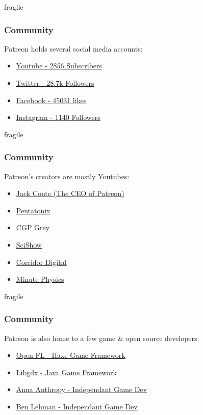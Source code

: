 \documentclass[10pt, compress]{beamer}
\begin{document}
\begin{frame}{fragile}
\frametitle{Community}
\begin{center}
    Patreon holds several social media accounts:
\end{center}
    \begin{itemize}
      \item \href{https://www.youtube.com/user/PatreonCommandCenter}{\alert{Youtube - 2856 Subscribers}}
      \item \href{https://twitter.com/patreon}{\alert{Twitter - 28.7k Followers}}
      \item \href{https://www.facebook.com/patreon}{\alert{Facebook - 45031 likes}}
      \item \href{https://instagram.com/patreon/}{\alert{Instagram - 1140 Followers}}
    \end{itemize}
\end{frame}

\begin{frame}{fragile}
\frametitle{Community}
\begin{center}
    Patreon's creators are mostly Youtubes:
\end{center}
    \begin{itemize}
      \item \href{https://www.patreon.com/jackconte}{\alert{Jack Conte (The CEO of Patreon)}}
      \item \href{https://www.patreon.com/pentatonix}{\alert{Pentatonix}}
      \item \href{https://www.patreon.com/cgpgrey}{\alert{CGP Grey}}
      \item \href{https://www.patreon.com/scishow}{\alert{SciShow}}
      \item \href{https://www.patreon.com/CorridorDigital}{\alert{Corridor Digital}}
      \item \href{https://www.patreon.com/minutephysics}{\alert{Minute Physics}}
    \end{itemize}
\end{frame}

\begin{frame}{fragile}
\frametitle{Community}
\begin{center}
    Patreon is also home to a few game \& open source developers:
\end{center}
    \begin{itemize}
      \item \href{https://www.patreon.com/openfl}{\alert{Open FL - Haxe Game Framework}}
      \item \href{https://www.patreon.com/libgdx}{\alert{Libgdx - Java Game Framework}}
      \item \href{https://www.patreon.com/queenofspace}{\alert{Anna Anthropy - Independant Game Dev}}
      \item \href{https://www.patreon.com/benlehman}{\alert{Ben Lehman - Independant Game Dev}}
    \end{itemize}
\end{frame}
\end{document}
